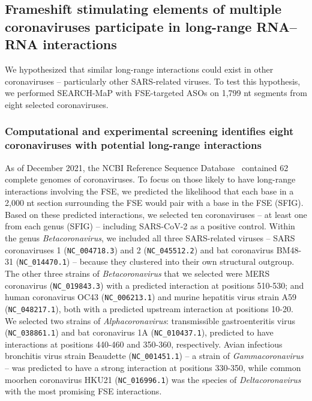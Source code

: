 \documentclass[main.tex]{subfiles}
\begin{document}
\subsection{Frameshift stimulating elements of multiple coronaviruses participate in long-range RNA--RNA interactions}

We hypothesized that similar long-range interactions could exist in other coronaviruses -- particularly other SARS-related viruses.
To test this hypothesis, we performed SEARCH-MaP with FSE-targeted ASOs on 1,799 nt segments from eight selected coronaviruses.


\subsubsection{Computational and experimental screening identifies eight coronaviruses with potential long-range interactions}

As of December 2021, the NCBI Reference Sequence Database~\cite{OLeary2016} contained 62 complete genomes of coronaviruses.
To focus on those likely to have long-range interactions involving the FSE, we predicted the likelihood that each base in a 2,000 nt section surrounding the FSE would pair with a base in the FSE (SFIG).
Based on these predicted interactions, we selected ten coronaviruses -- at least one from each genus (SFIG) -- including SARS-CoV-2 as a positive control.
Within the genus \textit{Betacoronavirus}, we included all three SARS-related viruses -- SARS coronaviruses 1 (\verb|NC_004718.3|) and 2 (\verb|NC_045512.2|) and bat coronavirus BM48-31 (\verb|NC_014470.1|) -- because they clustered into their own structural outgroup.
The other three strains of \textit{Betacoronavirus} that we selected were MERS coronavirus (\verb|NC_019843.3|) with a predicted interaction at positions 510-530; and human coronavirus OC43 (\verb|NC_006213.1|) and murine hepatitis virus strain A59 (\verb|NC_048217.1|), both with a predicted upstream interaction at positions 10-20.
We selected two strains of \textit{Alphacoronavirus}: transmissible gastroenteritis virus (\verb|NC_038861.1|) and bat coronavirus 1A (\verb|NC_010437.1|), predicted to have interactions at positions 440-460 and 350-360, respectively.
Avian infectious bronchitis virus strain Beaudette (\verb|NC_001451.1|) -- a strain of \textit{Gammacoronavirus} -- was predicted to have a strong interaction at positions 330-350, while common moorhen coronavirus HKU21 (\verb|NC_016996.1|) was the species of \textit{Deltacoronavirus} with the most promising FSE interactions.
\end{document}
